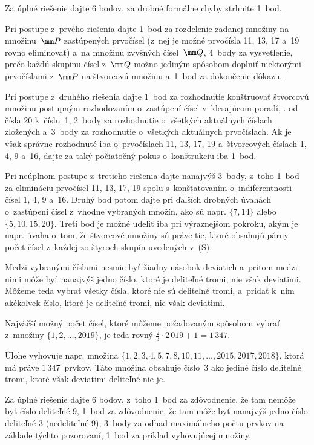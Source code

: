 {\nobreak\medskip\petit\noindent
Za úplné riešenie dajte 6 bodov, za drobné formálne chyby strhnite
1~bod.

Pri postupe z~prvého riešenia dajte 1~bod za rozdelenie zadanej
množiny na množinu~$\mm P$ zastúpených prvočísel (z~nej je možné
prvočísla 11, 13, 17 a~19 rovno eliminovať) a~na množinu
zvyšných čísel~$\mm Q$, 4~body za vysvetlenie, prečo každú skupinu
čísel z~$\mm Q$ možno jediným spôsobom doplniť niektorými prvočíslami z~$\mm P$
na štvorcovú množinu a~1~bod za dokončenie dôkazu.

Pri postupe z~druhého riešenia dajte 1~bod za
rozhodnutie konštruovať štvorcovú množinu postupným rozhodovaním
o~zastúpení čísel v~klesajúcom poradí, \tj. od čísla 20 k~číslu~1,
2~body za rozhodnutie o~všetkých aktuálnych číslach zložených
a~3~body za rozhodnutie o~všetkých aktuálnych prvočíslach.
Ak je však správne rozhodnuté iba o~prvočíslach 11, 13, 17, 19
a~štvorcových číslach 1, 4, 9 a~16, dajte za taký počiatočný pokus
o~konštrukciu iba 1~bod.

Pri neúplnom postupe z~tretieho riešenia dajte nanajvýš 3~body,
z~toho 1~bod za elimináciu prvočísel 11, 13, 17, 19 spolu
s~konštatovaním o~indiferentnosti čísel 1, 4, 9 a~16.
Druhý bod potom dajte pri ďalších drobných úvahách o~zastúpení čísel
z~vhodne vybraných množín, ako sú napr. $\{7,14\}$ alebo
$\{5,10,15,20\}$. Tretí bod je možné udeliť iba pri výraznejšom
pokroku, akým je napr. úvaha o~tom, že štvorcové množiny sú práve tie,
ktoré obsahujú párny počet čísel z~každej zo štyroch skupín uvedených v~(S).

\endpetit
\bigbreak
}

{%
Medzi vybranými číslami nesmie byť žiadny násobok deviatich a~pritom medzi nimi
môže byť nanajvýš jedno číslo, ktoré je deliteľné tromi, nie však deviatimi.
Môžeme teda vybrať všetky čísla, ktoré nie sú deliteľné tromi, a~pridať
k~nim akékoľvek číslo, ktoré je deliteľné tromi, nie však deviatimi.

\zaver
Najväčší možný počet čísel, ktoré môžeme požadovaným
spôsobom vybrať z~množiny $\{1, 2,\ldots, 2019\}$, je teda rovný
$\frac23\cdot 2\,019+1=1\,347$.

\smallskip
Úlohe vyhovuje napr. množina $\{1,2,3,4,5,7,8,10,11,\dots,2015,2017,2018\}$,
ktorá má práve $1\,347$~prvkov.
Táto množina obsahuje číslo~3 ako jediné číslo deliteľné tromi, ktoré
však deviatimi deliteľné nie je.

\nobreak\medskip\petit\noindent
Za úplné riešenie dajte 6 bodov, z~toho
1~bod za zdôvodnenie, že tam nemôže byť číslo deliteľné 9,
1~bod za zdôvodnenie, že tam môže byť nanajvýš jedno číslo deliteľné 3 (nedeliteľné 9),
3~body za odhad maximálneho počtu prvkov na základe týchto pozorovaní,
1~bod za príklad vyhovujúcej množiny.

\endpetit
\bigbreak
}

